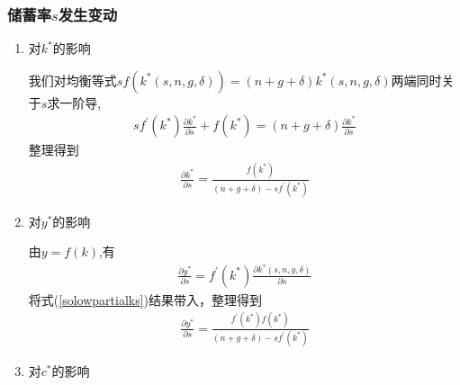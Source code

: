 \documentclass[cn,normal,11pt,black]{elegantnote}
\begin{document}
\subsubsection*{储蓄率$s$发生变动}
    \begin{enumerate}
        \item 对$k^*$的影响

                我们对均衡等式$s f\left(k^{*}(s, n, g, \delta)\right)=(n+g+\delta) k^{*}(s, n, g, \delta)$两端同时关于$s$求一阶导,
                    \begin{align}
                        s f^{\prime}\left(k^{*}\right) \frac{\partial k^{*}}{\partial s}+f\left(k^{*}\right) = 
                            (n+g+\delta) \frac{\partial k^{*}}{\partial s}
                    \end{align}
                整理得到
                    \begin{align}\label{solowpartialks}
                        \frac{\partial k^{*}}{\partial s} = \frac{f\left(k^{*}\right)}{(n+g+\delta)-s f^{\prime}\left(k^{*}\right)}
                    \end{align} 

        \item 对$y^*$的影响

                由$y=f(k)$,有
                    \begin{align}
                        \frac{\partial y^{*}}{\partial s} = 
                            f^{\prime}\left(k^{*}\right) \frac{\partial k^{*}(s, n, g, \delta)}{\partial s}
                    \end{align}
                将式(\ref{solowpartialks})结果带入，整理得到
                    \begin{align}
                        \frac{\partial y^{*}}{\partial s} = 
                            \frac{f^{\prime}\left(k^{*}\right) f\left(k^{*}\right)}{(n+g+\delta)-s f^{\prime}\left(k^{*}\right)}
                    \end{align}

        \item 对$c^*$的影响


\end{enumerate}
\end{document}
